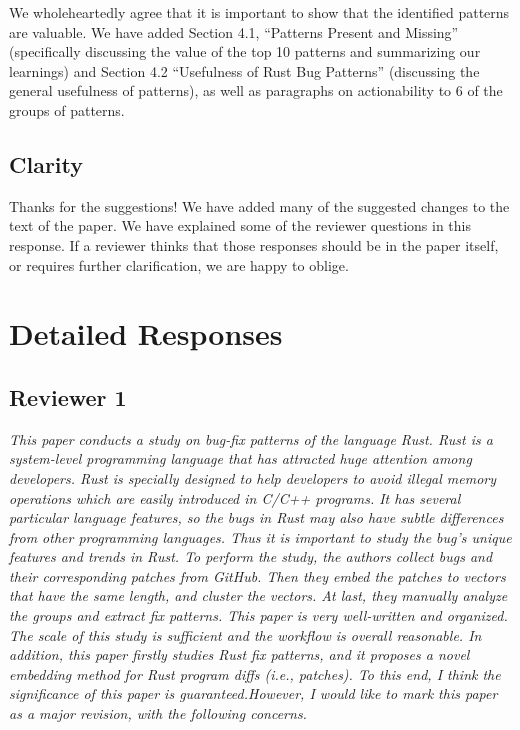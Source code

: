 \documentclass{article}
\begin{document}
We wholeheartedly agree that it is important to show that the identified patterns are valuable. We have added Section 4.1, “Patterns Present and Missing” (specifically discussing the value of the top 10 patterns and summarizing our learnings) and Section 4.2 “Usefulness of Rust Bug Patterns” (discussing the general usefulness of patterns), as well as paragraphs on actionability to 6 of the groups of patterns. 

\subsection{Clarity}

Thanks for the suggestions! We have added many of the suggested changes to the text of the paper. We have explained some of the reviewer questions in this response. If a reviewer thinks that those responses should be in the paper itself, or requires further clarification, we are happy to oblige.

\section{Detailed Responses}

\subsection{Reviewer 1}

\textit{This paper conducts a study on bug-fix patterns of the language Rust. Rust is a system-level programming language that has attracted huge attention among developers. Rust is specially designed to help developers to avoid illegal memory operations which are easily introduced in C/C++ programs. It has several particular language features, so the bugs in Rust may also have subtle differences from other programming languages. Thus it is important to study the bug's unique features and trends in Rust.
To perform the study, the authors collect bugs and their corresponding patches from GitHub. Then they embed the patches to vectors that have the same length, and cluster the vectors. At last, they manually analyze the groups and extract fix patterns.
This paper is very well-written and organized. The scale of this study is sufficient and the workflow is overall reasonable. In addition, this paper firstly studies Rust fix patterns, and it proposes a novel embedding method for Rust program diffs (i.e., patches). To this end, I think the significance of this paper is guaranteed.However, I would like to mark this paper as a major revision, with the following concerns.}
\end{document}
